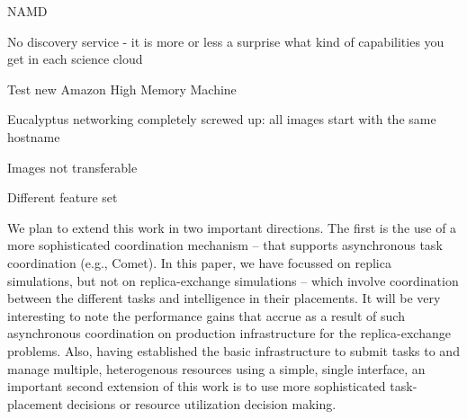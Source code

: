 \documentclass[conference,final]{IEEEtran}
\begin{document}
NAMD

No discovery service - it is more or less a surprise what kind of capabilities you get in each science cloud

Test new Amazon High Memory Machine

Eucalyptus networking completely screwed up: all images start with the same hostname

Images not transferable

Different feature set


We plan to extend this work in two important directions. The first is
the use of a more sophisticated coordination mechanism -- that
supports asynchronous task coordination (e.g., Comet). In this paper,
we have focussed on replica simulations, but not on replica-exchange
simulations -- which involve coordination between the different tasks
and intelligence in their placements.  It will be very interesting to
note the performance gains that accrue as a result of such
asynchronous coordination on production infrastructure for the
replica-exchange problems. Also, having established the basic
infrastructure to submit tasks to and manage multiple, heterogenous
resources using a simple, single interface, an important second
extension of this work is to use more sophisticated task-placement
decisions or resource utilization decision making.
\end{document}
